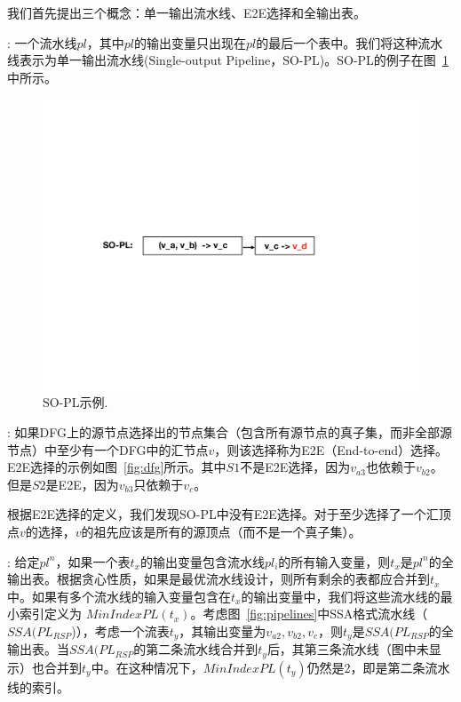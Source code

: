 我们首先提出三个概念：单一输出流水线、E2E选择和全输出表。

: 一个流水线$pl$，其中$pl$的输出变量只出现在$pl$的最后一个表中。我们将这种流水线表示为单一输出流水线(Single-output Pipeline，SO-PL)。SO-PL的例子在图~\ref{fig:sopl}中所示。
%
\begin{figure}[!htbp]
\includegraphics[width=0.8\linewidth]{figures/lp-68.pdf}
\centering
\caption{\small SO-PL示例.}
\label{fig:sopl}
\end{figure}

: 如果DFG上的源节点选择出的节点集合（包含所有源节点的真子集，而非全部源节点）中至少有一个DFG中的汇节点$v$，则该选择称为E2E（End-to-end）选择。E2E选择的示例如图~\ref{fig:dfg}所示。其中$S1$不是E2E选择，因为$v_{a3}$也依赖于$v_{b2}$。但是$S2$是E2E，因为$v_{b3}$只依赖于$v_c$。

根据E2E选择的定义，我们发现SO-PL中没有E2E选择。对于至少选择了一个汇顶点$v$的选择，$v$的祖先应该是所有的源顶点（而不是一个真子集）。

: 给定$pl^n$，如果一个表$t_x$的输出变量包含流水线$pl_i$的所有输入变量，则$t_x$是$pl^n$的全输出表。根据贪心性质，如果是最优流水线设计，则所有剩余的表都应合并到$t_x$中。如果有多个流水线的输入变量包含在$t_x$的输出变量中，我们将这些流水线的最小索引定义为 $MinIndexPL(t_x)$。考虑图~\ref{fig:pipelines}中SSA格式流水线（$SSA(PL_{RSP}$)），考虑一个流表$t_y$，其输出变量为$v_{a2}, v_{b2}, v_c$，则$t_y$是$SSA(PL_{RSP}$的全输出表。当$SSA(PL_{RSP}$的第二条流水线合并到$t_y$后，其第三条流水线（图中未显示）也合并到$t_y$中。在这种情况下，$MinIndexPL(t_y)$仍然是2，即是第二条流水线的索引。


